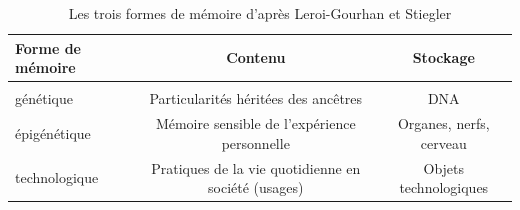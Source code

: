 \begin{table}[ht]
    \begin{tabulary}{\textwidth}{L|C C}
        \centering
        \textbf{Forme de mémoire} &  \textbf{Contenu}  & \textbf{Stockage} \\[3ex]
        \hline \\ [-1.5ex]
        génétique  &  Particularités héritées des ancêtres   &  DNA \\[3ex]
        
        épigénétique   &  Mémoire sensible de l’expérience personnelle   &  Organes, nerfs, cerveau \\[3ex]
        
        technologique  &  Pratiques de la vie quotidienne en société (usages) & Objets technologiques \\[3ex]
    \end{tabulary}
    \caption{Les trois formes de mémoire d{\textquoteright}après Leroi-Gourhan et Stiegler}
\end{table}


